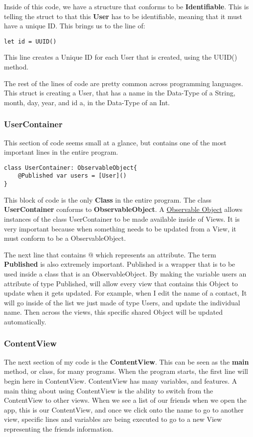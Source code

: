 \documentclass{article}
\theoremstyle{theorem}
\theoremstyle{definition}
\theoremstyle{remark}
\begin{document}
\noindent\newline Inside of this code, we have a structure that conforms to be \textbf{Identifiable}. This is telling the struct to that this \textbf{User} has to be identifiable, meaning that it must have a unique ID. This brings us to the line of:
\begin{verbatim}
let id = UUID()
\end{verbatim}
This line creates a Unique ID for each User that is created, using the UUID() method. 

\noindent\newline The rest of the lines of code are pretty common across programming languages. This struct is creating a User, that has a name in the Data-Type of a String, month, day, year, and id a, in the Data-Type of an Int. 

\subsubsection{UserContainer}
This section of code seems small at a glance, but contains one of the most important lines in the entire program.
\begin{verbatim}
class UserContainer: ObservableObject{
    @Published var users = [User]()
}
\end{verbatim}
This block of code is the only \textbf{Class} in the entire program. The class \textbf{UserContainer} conforms to \textbf{ObservableObject}. A \href{https://www.hackingwithswift.com/quick-start/swiftui/how-to-use-observedobject-to-manage-state-from-external-objects}{Observable Object} allows instances of the class UserContainer to be made available inside of Views. It is very important because when something needs to be updated from a View, it must conform to be a ObservableObject. 

\noindent\newline The next line that contains @ which represents an attribute. The term \textbf{Published} is also extremely important. Published is a wrapper that is to be used inside a class that is an ObservableObject. By making the variable users an attribute of type Published, will allow every view that contains this Object to update when it gets updated. For example, when I edit the name of a contact, It will go inside of the list we just made of type Users, and update the individual name. Then across the views, this specific shared Object will be updated automatically. 

\subsubsection{ContentView}
The next section of my code is the \textbf{ContentView}. This can be seen as the \textbf{main} method, or class, for many programs. When the program starts, the first line will begin here in ContentView. ContentView has many variables, and features. A main thing about using ContentView is the ability to switch from the ContentView to other views. When we see a list of our friends when we open the app, this is our ContentView, and once we click onto the name to go to another view, specific lines and variables are being executed to go to a new View representing the friends information.
\end{document}
